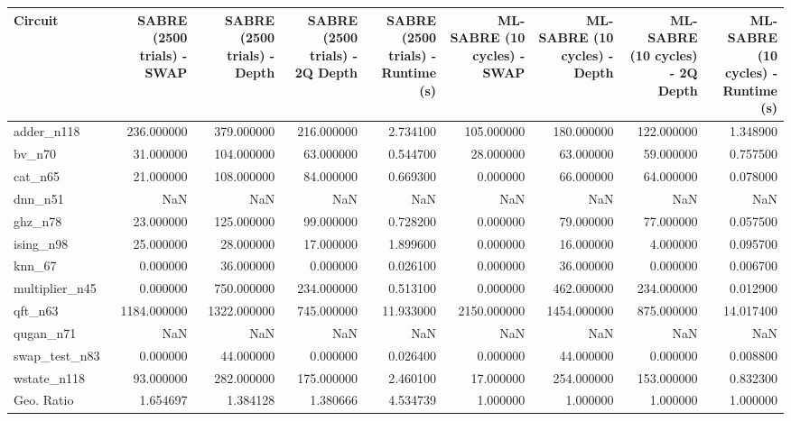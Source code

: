 \begin{tabular}{lrrrrrrrr}
\toprule
Circuit & SABRE (2500 trials) - SWAP & SABRE (2500 trials) - Depth & SABRE (2500 trials) - 2Q Depth & SABRE (2500 trials) - Runtime (s) & ML-SABRE (10 cycles) - SWAP & ML-SABRE (10 cycles) - Depth & ML-SABRE (10 cycles) - 2Q Depth & ML-SABRE (10 cycles) - Runtime (s) \\
\midrule
adder\_n118 & 236.000000 & 379.000000 & 216.000000 & 2.734100 & 105.000000 & 180.000000 & 122.000000 & 1.348900 \\
bv\_n70 & 31.000000 & 104.000000 & 63.000000 & 0.544700 & 28.000000 & 63.000000 & 59.000000 & 0.757500 \\
cat\_n65 & 21.000000 & 108.000000 & 84.000000 & 0.669300 & 0.000000 & 66.000000 & 64.000000 & 0.078000 \\
dnn\_n51 & NaN & NaN & NaN & NaN & NaN & NaN & NaN & NaN \\
ghz\_n78 & 23.000000 & 125.000000 & 99.000000 & 0.728200 & 0.000000 & 79.000000 & 77.000000 & 0.057500 \\
ising\_n98 & 25.000000 & 28.000000 & 17.000000 & 1.899600 & 0.000000 & 16.000000 & 4.000000 & 0.095700 \\
knn\_67 & 0.000000 & 36.000000 & 0.000000 & 0.026100 & 0.000000 & 36.000000 & 0.000000 & 0.006700 \\
multiplier\_n45 & 0.000000 & 750.000000 & 234.000000 & 0.513100 & 0.000000 & 462.000000 & 234.000000 & 0.012900 \\
qft\_n63 & 1184.000000 & 1322.000000 & 745.000000 & 11.933000 & 2150.000000 & 1454.000000 & 875.000000 & 14.017400 \\
qugan\_n71 & NaN & NaN & NaN & NaN & NaN & NaN & NaN & NaN \\
swap\_test\_n83 & 0.000000 & 44.000000 & 0.000000 & 0.026400 & 0.000000 & 44.000000 & 0.000000 & 0.008800 \\
wstate\_n118 & 93.000000 & 282.000000 & 175.000000 & 2.460100 & 17.000000 & 254.000000 & 153.000000 & 0.832300 \\
Geo. Ratio & 1.654697 & 1.384128 & 1.380666 & 4.534739 & 1.000000 & 1.000000 & 1.000000 & 1.000000 \\
\bottomrule
\end{tabular}
